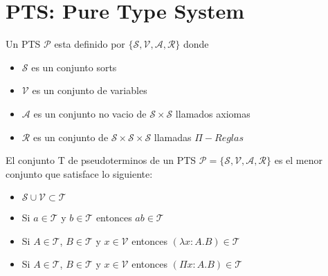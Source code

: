 \section{PTS: Pure Type System}

\begin{definition}
Un PTS $\mathcal{P} $ esta definido por $\{ \mathcal{S}, \mathcal{V}, \mathcal{A}, \mathcal{R}\}$ donde

\begin{itemize}
    \item{$\mathcal{S}$} es un conjunto sorts
    \item{$\mathcal{V}$} es un conjunto de variables
    \item{$\mathcal{A}$} es un conjunto no vacio de $\mathcal{S}\times\mathcal{S}$ llamados axiomas 
    \item{$\mathcal{R}$} es un conjunto de $\mathcal{S}\times\mathcal{S}\times\mathcal{S}$ llamadas $\Pi-Reglas$ 
\end{itemize}
\end{definition}

\begin{definition}
El conjunto T de pseudoterminos de un PTS $ \mathcal{P} = \{ \mathcal{S}, \mathcal{V}, \mathcal{A}, \mathcal{R}\}$ 
es el menor conjunto que satisface lo siguiente:
\begin{itemize}
    \item{} $\mathcal{S} \cup \mathcal{V} \subset \mathcal{T}$
    \item{} Si $a \in \mathcal{T}$ y $b \in \mathcal{T}$ entonces $ab \in\mathcal{T}$
    \item{} Si $A \in \mathcal{T}$,  $B \in \mathcal{T}$  y $x \in \mathcal{V}$  entonces $(\lambda x:A.B) \in\mathcal{T}$
    \item{} Si $A \in \mathcal{T}$,  $B \in \mathcal{T}$  y $x \in \mathcal{V}$  entonces $(\Pi x:A.B) \in\mathcal{T}$
\end{itemize}

\end{definition}

